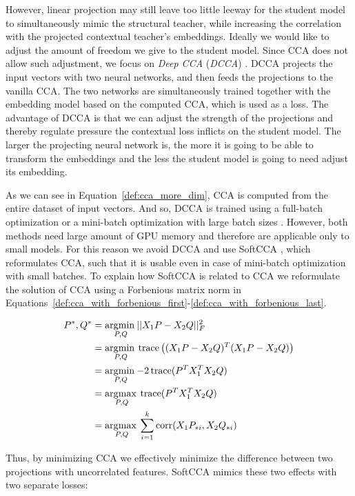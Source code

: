 However, linear projection may still leave too little leeway for the student
model to simultaneously mimic the structural teacher, while increasing the
correlation with the projected contextual teacher's embeddings. Ideally we
would like to adjust the amount of freedom we give to the student model. Since
CCA does not allow such adjustment, we focus on \emph{Deep CCA} (\emph{DCCA})
\citep{andrew2013deep}. DCCA projects the input vectors with two neural
networks, and then feeds the projections to the vanilla CCA. The two networks
are simultaneously trained together with the embedding model based on the
computed CCA, which is used as a loss. The advantage of DCCA is that we can
adjust the strength of the projections and thereby regulate pressure the
contextual loss inflicts on the student model. The larger the projecting neural
network is, the more it is going to be able to transform the embeddings and the
less the student model is going to need adjust its embedding.

As we can see in Equation~\ref{def:cca_more_dim}, CCA is computed from the
entire dataset of input vectors. And so, DCCA is trained using a full-batch
optimization \citep{andrew2013deep} or a mini-batch optimization with large
batch sizes \citep{wang2015unsupervised}. However, both methods need large
amount of GPU memory and therefore are applicable only to small models. For
this reason we avoid DCCA and use SoftCCA \citep{chang2018scalable}, which
reformulates CCA, such that it is usable even in case of mini-batch
optimization with small batches. To explain how SoftCCA is related to CCA we
reformulate the solution of CCA using a Forbenious matrix norm in
Equations~\ref{def:cca_with_forbenious_first}-\ref{def:cca_with_forbenious_last}.

\begin{align}
  P^\ast, Q^\ast &= \underset{P, Q}{\operatorname*{\arg\!\min\medspace}} ||X_1P - X_2Q||^2_F \label{def:cca_with_forbenious_first} \\
  &= \underset{P, Q}{\operatorname*{\arg\!\min\medspace}} \operatorname*{trace}\left((X_1P - X_2Q)^T(X_1P - X_2Q)\right) \\
  &= \underset{P, Q}{\operatorname*{\arg\!\min\medspace}} {-2} \operatorname*{trace}(P^TX_1^TX_2Q) \\
  &= \underset{P, Q}{\operatorname*{\arg\!\max\medspace}} \operatorname*{trace}(P^TX_1^TX_2Q) \\
  &= \underset{P, Q}{\operatorname*{\arg\!\max\medspace}} \sum_{i = 1}^k \operatorname*{corr}(X_1P_{*i}, X_2Q_{*i}) \label{def:cca_with_forbenious_last}
\end{align}

Thus, by minimizing CCA we effectively minimize the difference between two
projections with uncorrelated features. SoftCCA mimics these two effects with
two separate losses:

